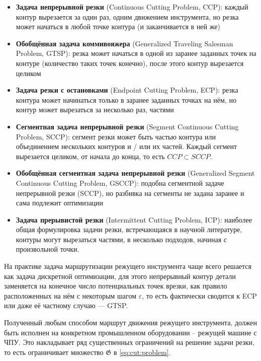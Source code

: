 \begin{itemize}
  \item
  \textbf{Задача непрерывной резки}
  (Continuous Cutting Problem, CCP):
  каждый контур
  вырезается за один раз,
  одним движением инструмента,
  но резка может начаться в любой точке контура
  (и заканчивается в ней же)

  \item
  \textbf{Обобщённая задача коммивояжера}
  (Generalized Traveling Salesman Problem, GTSP):
  резка может начаться в одной из заранее
  заданных точек на контуре
  (количество таких точек конечно),
  после этого контур вырезается целиком

  \item
  \textbf{Задача резки с остановками}
  (Endpoint Cutting Problem, ECP):
  резка контура может начинаться только в
  заранее заданных точках на нём,
  но контур может вырезаться за несколько раз,
  частями

  \item
  \textbf{Сегментная задача непрерывной резки}
  (Segment Continuous Cutting Problem, SCCP):
  сегмент резки может быть частью контура
  или объединением нескольких контуров
  и / или их частей.
  Каждый сегмент вырезается целиком,
  от начала до конца,
  то есть
  $ CCP \subset SCCP$.

  \item
  \textbf{Обобщённая сегментная задача непрерывной резки}
  (Generalized Segment Continuous Cutting Problem, GSCCP):
  подобна сегментной задаче непрерывной резки
  (SCCP),
  но разбивка на сегменты не задана заранее
  и сама подлежит оптимизации

  \item
  \textbf{Задача прерывистой резки}
  (Intermittent Cutting Problem, ICP):
  наиболее общая формулировка задачи резки,
  встречающаяся в научной литературе,
  контуры могут вырезаться частями,
  в несколько подходов,
  начиная с произвольной точки.
\end{itemize}

На практике
задача маршрутизации режущего инструмента
чаще всего решается
как задача дискретной оптимизации,
для этого непрерывный контур детали
заменяется на конечное число
потенциальных точек врезки,
как правило расположенных на нём
с некоторым шагом
$\varepsilon$,
то есть фактически сводится к
ECP
или даже её частному случаю ---
GTSP.

Полученный любым способом
маршрут движения режущего инструмента,
должен быть исполнен
на конкретном промышленном оборудовании --
режущей машине с ЧПУ.
Это накладывает ряд
существенных ограничений
на решение задачи резки,
то есть ограничивает множество
$\mathfrak G$ в \eqref{eq:cut:problem}.

